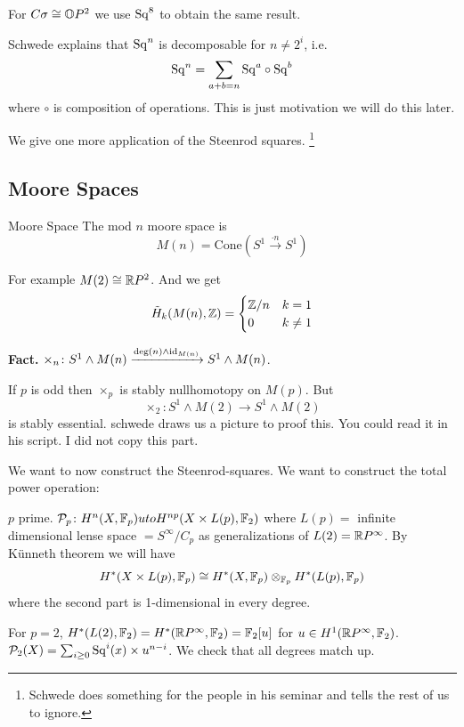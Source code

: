 \documentclass[language=english]{TemplateLecture}
\begin{document}
For \(C\sigma \cong \mathbb{O} P^2\) we use \(\mathrm{Sq}^8\) to obtain the same result.

Schwede explains that \(\mathrm{Sq}^n\) is decomposable for \(n \neq 2^i\), i.e.
\[\mathrm{Sq}^n = \sum_{a+b = n} \mathrm{Sq}^a \circ \mathrm{Sq}^b\]
where \(\circ\) is composition of operations. This is just motivation we will do this later.

We give one more application of the Steenrod squares. \footnote{Schwede does something for the people in his seminar and tells the rest of us to ignore.}

\subsection{Moore Spaces}

\begin{defi}{Moore Space}{}
The mod \(n\) moore space is
\[M(n) = \mathrm{Cone}(S^1\xrightarrow{\cdot n} S^1)\]
\end{defi}

For example \(M(2)\cong \mathbb{R} P^2\). And we get
\[\tilde H_k(M(n), \mathbb{Z}) = \begin{cases}
    \mathbb{Z}/n & k = 1 \\
    0 & k \neq 1 \\
\end{cases}\]

\textbf{Fact.} \(\times_n\colon S^1 \wedge M(n)\xrightarrow{\deg(n)\wedge \operatorname{id}_{M(n)}} S^1 \wedge M(n)\).

If \(p\) is odd then \(\times_p\) is stably nullhomotopy on \(M(p)\). But
\[\times_2\colon S^1\wedge M(2) \to S^1\wedge M(2)\]
is stably essential. schwede draws us a picture to proof this. You could read it in his script. I did not copy this part.



We want to now construct the Steenrod-squares. We want to construct the total power operation:

\(p\) prime. \(\mathcal{P}_p\colon H^n(X, \mathbb{F}_p) uto H^{np}(X\times L(p), \mathbb{F}_2)\) where \(L(p) = \) infinite dimensional lense space \(= S^\infty/{C_p}\) as generalizations of \(L(2) = \mathbb{R} P^\infty\). By Künneth theorem we will have
\[H^*(X\times L(p), \mathbb{F}_p) \cong H^*(X, \mathbb{F}_p)\otimes_{\mathbb{F}_p} H^*(L(p), \mathbb{F}_p)\]
where the second part is 1-dimensional in every degree.

For \(p= 2\), \(H^*(L(2),\mathbb{F}_2) = H^*(\mathbb{R} P^\infty, \mathbb{F}_2) = \mathbb{F}_2[u]\) for \(u \in H^1(\mathbb{R} P^\infty, \mathbb{F}_2)\). \(\mathcal{P}_2(X) = \sum_{i\geq 0}\mathrm{Sq}^i(x)\times u^{n-i}\). We check that all degrees match up.
\end{document}
